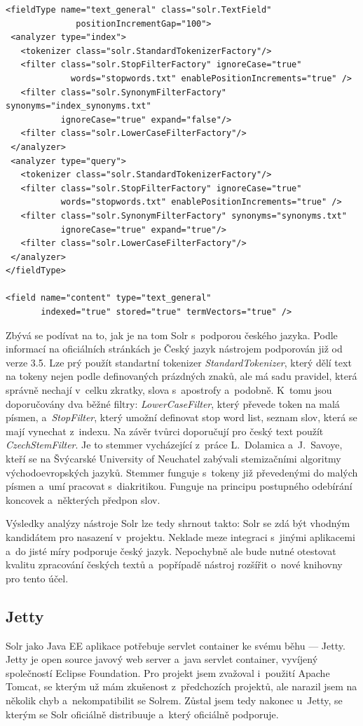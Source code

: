 \begin{verbatim}
<fieldType name="text_general" class="solr.TextField" 
			  positionIncrementGap="100">
 <analyzer type="index">
   <tokenizer class="solr.StandardTokenizerFactory"/>
   <filter class="solr.StopFilterFactory" ignoreCase="true" 
 		     words="stopwords.txt" enablePositionIncrements="true" />
   <filter class="solr.SynonymFilterFactory" synonyms="index_synonyms.txt" 
           ignoreCase="true" expand="false"/>
   <filter class="solr.LowerCaseFilterFactory"/>
 </analyzer>
 <analyzer type="query">
   <tokenizer class="solr.StandardTokenizerFactory"/>
   <filter class="solr.StopFilterFactory" ignoreCase="true" 
           words="stopwords.txt" enablePositionIncrements="true" />
   <filter class="solr.SynonymFilterFactory" synonyms="synonyms.txt"
           ignoreCase="true" expand="true"/>
   <filter class="solr.LowerCaseFilterFactory"/>
 </analyzer>
</fieldType>

<field name="content" type="text_general" 
       indexed="true" stored="true" termVectors="true" />
\end{verbatim}

Zbývá se podívat na to, jak je na tom Solr s~podporou českého jazyka. Podle informací na oficiálních stránkách\cite{sorl:wiki} je Český jazyk nástrojem podporován již od verze 3.5. Lze prý použít standartní tokenizer \emph{StandardTokenizer}, který dělí text na tokeny nejen podle definovaných prázdných znaků, ale má sadu pravidel, která správně nechají v~celku zkratky, slova s~apostrofy a~podobně. K~tomu jsou doporučovány dva běžné filtry: \emph{LowerCaseFilter}, který převede token na malá písmen, a~\emph{StopFilter}, který umožní definovat stop word list, seznam slov, která se mají vynechat z~indexu. Na závěr tvůrci doporučují pro český text použít \emph{CzechStemFilter}. Je to stemmer vycházející z~práce L.~Dolamica a~J.~Savoye, kteří se na Švýcarské University of Neuchatel zabývali stemizačními algoritmy východoevropských jazyků. Stemmer funguje s~tokeny již převedenými do malých písmen a~umí pracovat s~diakritikou. Funguje na principu postupného odebírání koncovek a~některých předpon slov.

Výsledky analýzy nástroje Solr lze tedy shrnout takto: Solr se zdá být vhodným kandidátem pro nasazení v~projektu. Neklade meze integraci s~jinými aplikacemi a~do jisté míry podporuje český jazyk. Nepochybně ale bude nutné otestovat kvalitu zpracování českých textů a~popřípadě nástroj rozšířit o~nové knihovny pro tento účel.

\subsection{Jetty}
Solr jako Java EE aplikace potřebuje servlet container ke svému běhu --- Jetty. Jetty\cite{jetty:doc} je open source javový web server a~java servlet container, vyvíjený společností Eclipse Foundation. Pro projekt jsem zvažoval i~použití Apache Tomcat\cite{tomcat:doc}, se kterým už mám zkušenost z~předchozích projektů, ale narazil jsem na několik chyb a~nekompatibilit se Solrem. Zůstal jsem tedy nakonec u~Jetty, se kterým se Solr oficiálně distribuuje a~který oficiálně podporuje.

